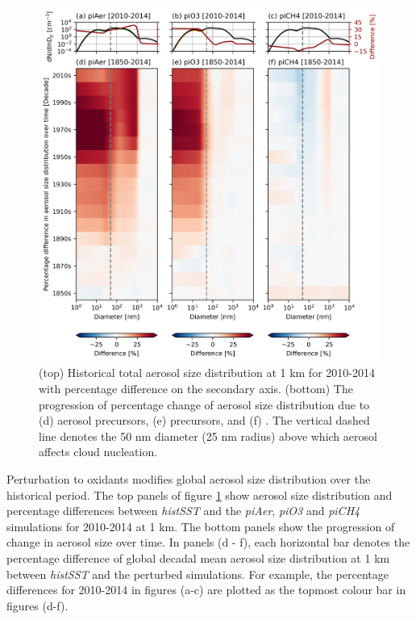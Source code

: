 \begin{figure}
    \centering
    \includegraphics[width=\linewidth]{Chapter3/Figs/f08_aerosol-size-dist-over-time.png}
    \caption[Aerosol size distribution for 2010-2014 at 1 km]{(top) Historical total aerosol size distribution at 1 km for 2010-2014 with percentage difference on the secondary axis. (bottom) The progression of percentage change of aerosol size distribution due to (d) aerosol precursors, (e)  precursors, and (f) . The vertical dashed line denotes the 50 nm diameter (25 nm radius) above which aerosol affects cloud nucleation.}
    \label{fig:ch3:aerosol-size-dist-time}
\end{figure}


Perturbation to oxidants modifies global aerosol size distribution over the historical period. The top panels of figure \ref{fig:ch3:aerosol-size-dist-time} show aerosol size distribution and percentage differences between \textit{histSST} and the \textit{piAer}, \textit{piO3} and \textit{piCH4} simulations for 2010-2014 at 1 km. The bottom panels show the progression of change in aerosol size over time. In panels (d - f), each horizontal bar denotes the percentage difference of global decadal mean aerosol size distribution at 1 km between \textit{histSST} and the perturbed simulations. For example, the percentage differences for 2010-2014 in figures (a-c) are plotted as the topmost colour bar in figures (d-f). 

